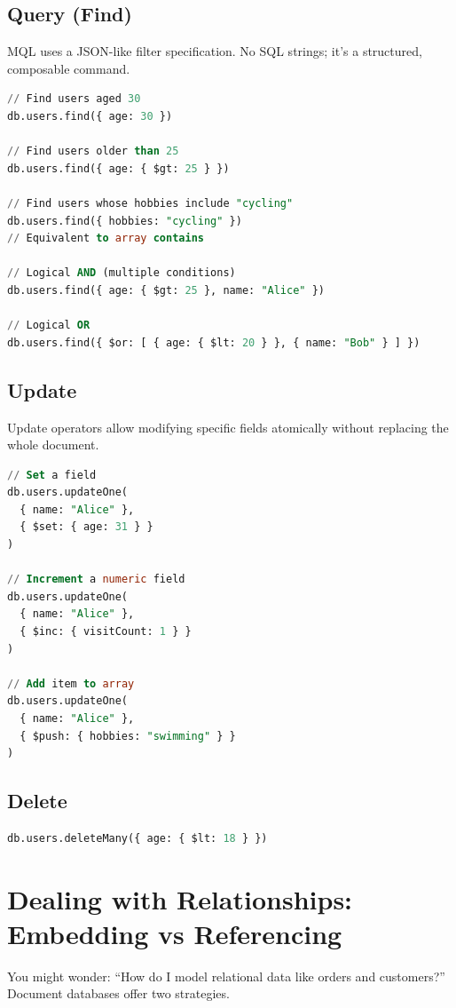 \documentclass[12pt,a4paper]{article}
\begin{document}
\subsection{Query (Find)}
MQL uses a JSON-like filter specification. No SQL strings; it's a structured, composable command.
\begin{lstlisting}[language=SQL, caption=Basic queries]
// Find users aged 30
db.users.find({ age: 30 })

// Find users older than 25
db.users.find({ age: { $gt: 25 } })

// Find users whose hobbies include "cycling"
db.users.find({ hobbies: "cycling" })
// Equivalent to array contains

// Logical AND (multiple conditions)
db.users.find({ age: { $gt: 25 }, name: "Alice" })

// Logical OR
db.users.find({ $or: [ { age: { $lt: 20 } }, { name: "Bob" } ] })
\end{lstlisting}

\subsection{Update}
Update operators allow modifying specific fields atomically without replacing the whole document.
\begin{lstlisting}[language=SQL, caption=Update examples]
// Set a field
db.users.updateOne(
  { name: "Alice" },
  { $set: { age: 31 } }
)

// Increment a numeric field
db.users.updateOne(
  { name: "Alice" },
  { $inc: { visitCount: 1 } }
)

// Add item to array
db.users.updateOne(
  { name: "Alice" },
  { $push: { hobbies: "swimming" } }
)
\end{lstlisting}

\subsection{Delete}
\begin{lstlisting}[language=SQL]
db.users.deleteMany({ age: { $lt: 18 } })
\end{lstlisting}

\section{Dealing with Relationships: Embedding vs Referencing}
You might wonder: ``How do I model relational data like orders and customers?'' Document databases offer two strategies.
\end{document}
